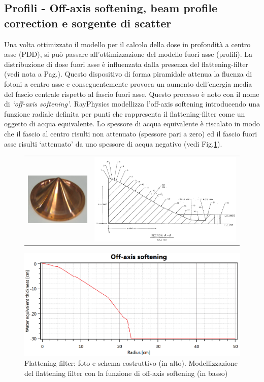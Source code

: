 \subsection{Profili - Off-axis softening, beam profile correction e sorgente di scatter}
Una volta ottimizzato il modello per il calcolo della dose in profondità a centro asse (PDD), si può passare all'ottimizzazione del modello fuori asse (profili). La distribuzione di dose fuori asse è influenzata dalla presenza del flattening-filter (vedi nota a Pag.\pageref{foot:flatt}). Questo dispositivo di forma piramidale attenua la fluenza di fotoni a centro asse e conseguentemente provoca un aumento dell'energia media del fascio centrale rispetto al fascio fuori asse. Questo processo è noto con il nome di \textit{`off-axis softening'}. RayPhysics modellizza l'off-axis softening introducendo una funzione radiale definita per punti che rappresenta il flattening-filter come un oggetto di acqua equivalente. Lo spessore di acqua equivalente è riscalato in modo che il fascio al centro risulti non attenuato (spessore pari a zero) ed il fascio fuori asse risulti `attenuato' da uno spessore di acqua negativo (vedi Fig.\ref{fig:Ray_flatt}).
\begin{figure}[!t]
\centering
\begin{tabular}{m{}m{}}
\vspace*{-0.5cm}\includegraphics[width=.3\textwidth]{./cap2/Ray_flatt1.png} &
\includegraphics[width=.6\textwidth]{./cap2/Ray_flatt2.png}
\end{tabular}
\includegraphics[width=.9\textwidth]{./cap2/Ray_flatt3.png}
\caption{Flattening filter: foto e schema costruttivo (in alto). Modellizzazione del flattening filter con la funzione di off-axis softening (in basso)}
\label{fig:Ray_flatt}
\end{figure}


